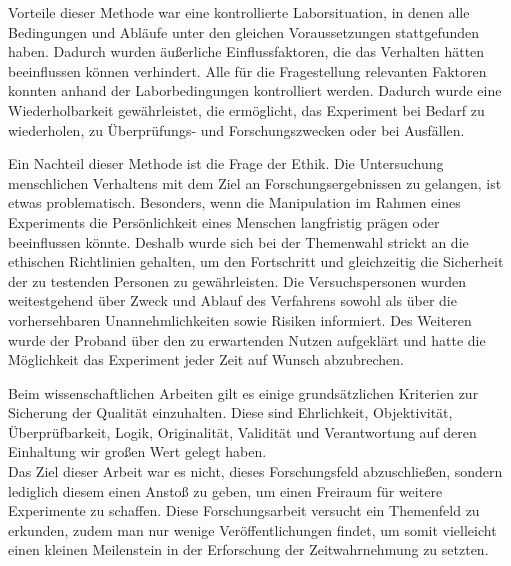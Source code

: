 \documentclass{Paper}
\begin{document}
	\par
		Vorteile dieser Methode war eine kontrollierte Laborsituation, in denen alle Bedingungen und
		Abläufe unter den gleichen Voraussetzungen stattgefunden haben. Dadurch wurden äußerliche
		Einflussfaktoren, die das Verhalten hätten beeinflussen können verhindert. Alle für die
		Fragestellung relevanten Faktoren konnten anhand der Laborbedingungen kontrolliert werden.
		Dadurch wurde eine Wiederholbarkeit gewährleistet, die ermöglicht, das Experiment bei Bedarf
		zu wiederholen, zu Überprüfungs- und Forschungszwecken oder bei Ausfällen.
		\par	
			Ein Nachteil dieser Methode ist die Frage der Ethik. Die Untersuchung menschlichen Verhaltens
		mit dem Ziel an Forschungsergebnissen zu gelangen, ist etwas problematisch. Besonders,
		wenn die Manipulation im Rahmen eines Experiments die Persönlichkeit eines Menschen
		langfristig prägen oder beeinflussen könnte. Deshalb wurde sich bei der Themenwahl strickt an die
		ethischen Richtlinien gehalten, um den Fortschritt und gleichzeitig die Sicherheit der zu
		testenden Personen zu gewährleisten. Die Versuchspersonen wurden weitestgehend über
		Zweck und Ablauf des Verfahrens sowohl als über die vorhersehbaren Unannehmlichkeiten sowie
		Risiken informiert. Des Weiteren wurde der Proband über den zu erwartenden Nutzen
		aufgeklärt und hatte die Möglichkeit das Experiment jeder Zeit auf Wunsch abzubrechen.
		\par	
Beim wissenschaftlichen Arbeiten gilt es einige grundsätzlichen Kriterien zur Sicherung der Qualität einzuhalten. Diese sind Ehrlichkeit, Objektivität, Überprüfbarkeit, Logik, Originalität, Validität 
und Verantwortung auf deren Einhaltung wir großen Wert gelegt haben.\\
Das Ziel dieser Arbeit war es nicht, dieses Forschungsfeld abzuschließen, sondern lediglich diesem einen Anstoß zu geben, um einen Freiraum für weitere Experimente zu schaffen. Diese Forschungsarbeit versucht ein Themenfeld zu erkunden, zudem man nur wenige Veröffentlichungen findet, um somit vielleicht einen kleinen Meilenstein in der Erforschung der Zeitwahrnehmung zu setzten.		

	
\end{document}
